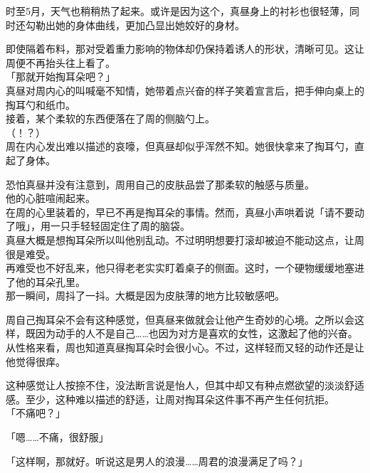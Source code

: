 时至5月，天气也稍稍热了起来。或许是因为这个，真昼身上的衬衫也很轻薄，同时还勾勒出她的身体曲线，更加凸显出她姣好的身材。

即使隔着布料，那对受着重力影响的物体却仍保持着诱人的形状，清晰可见。这让周便不再抬头往上看了。\\

「那就开始掏耳朵吧？」\\

真昼对周内心的叫喊毫不知情，她带着点兴奋的样子笑着宣言后，把手伸向桌上的掏耳勺和纸巾。\\

接着，某个柔软的东西便落在了周的侧脑勺上。\\

（！？）\\

周在内心发出难以描述的哀嚎，但真昼却似乎浑然不知。她很快拿来了掏耳勺，直起了身体。

恐怕真昼并没有注意到，周用自己的皮肤品尝了那柔软的触感与质量。\\

他的心脏喧闹起来。\\

在周的心里装着的，早已不再是掏耳朵的事情。然而，真昼小声哄着说「请不要动了哦」，用一只手轻轻固定住了周的脑袋。\\

真昼大概是想掏耳朵所以叫他别乱动。不过明明想要打滚却被迫不能动这点，让周很是难受。\\

再难受也不好乱来，他只得老老实实盯着桌子的侧面。这时，一个硬物缓缓地塞进了他的耳朵孔里。\\

那一瞬间，周抖了一抖。大概是因为皮肤薄的地方比较敏感吧。

周自己掏耳朵不会有这种感觉，但真昼来做就会让他产生奇妙的心境。之所以会这样，既因为动手的人不是自己……也因为对方是喜欢的女性，这激起了他的兴奋。\\

从性格来看，周也知道真昼掏耳朵时会很小心。不过，这样轻而又轻的动作还是让他觉得很痒。

这种感觉让人按捺不住，没法断言说是怡人，但其中却又有种点燃欲望的淡淡舒适感。至少，这种难以描述的舒适，让周对掏耳朵这件事不再产生任何抗拒。\\

「不痛吧？」

「嗯……不痛，很舒服」

「这样啊，那就好。听说这是男人的浪漫……周君的浪漫满足了吗？」

